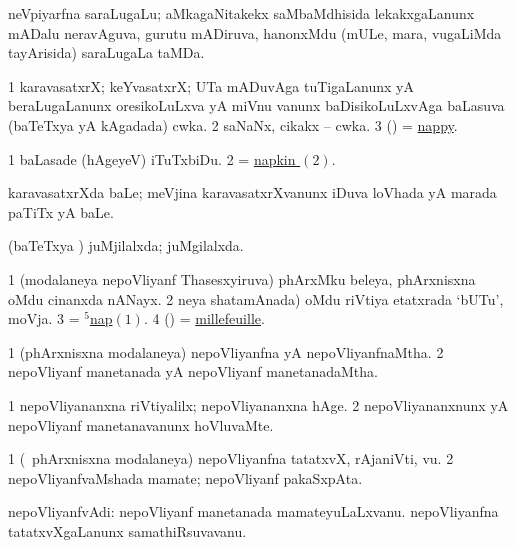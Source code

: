 \bentry
{}
\gl{\nA}
\bmng
neVpiyarfna saraLugaLu; aMkagaNitakekx saMbaMdhisida lekakxgaLanunx mADalu neravAguva, gurutu mADiruva, hanonxMdu (mULe, mara, \mo vugaLiMda tayArisida) saraLugaLa taMDa. 
\emng
\eentry

\bentry
{}
\gl{\nA}
\bmng
\bnum
\num{1} karavasatxrX; keYvasatxrX; UTa mADuvAga tuTigaLanunx yA beraLugaLanunx oresikoLuLxva yA miVnu \mo vanunx baDisikoLuLxvAga baLasuva (baTeTxya yA kAgadada) cwka. 
\hypertarget{napkin(2)}{} 
\num{2} saNaNx, cikakx -- cwka. 
\num{3} (\birx) = \hyperlink{nappy(1)}{nappy}. 
\enum
\emng

\noindent
\gl{\pagu}
\bmng
\bnum
\num{1}  baLasade (hAgeyeV) iTuTxbiDu. 
\num{2}  = \hyperlink{napkin(2)}{napkin \((2)\)}. 
\enum
\emng
\eentry

\bentry
{}
\gl{\nA}
\bmng
karavasatxrXda baLe; meVjina karavasatxrXvanunx iDuva loVhada yA marada paTiTx yA baLe. 
\emng
\eentry

\bentry
{}
\gl{\gu}
\bmng
(baTeTxya \vi) juMjilalxda; juMgilalxda. 
\emng
\eentry

\bentry
{}
\gl{\nA}
\bmng
\bnum
\num{1} (modalaneya nepoVliyanf Thasesxyiruva)  phArxMku beleya, phArxnisxna oMdu cinanxda nANayx. 
\num{2} neya shatamAnada) oMdu riVtiya etatxrada `bUTu', moVja. 
\num{3} = \hyperlink{nap(5)}{$^5$nap\((1)\)}. 
\num{4} (\ame) = \hyperref{kandict_m.pdf}{M}{millefeuille}{millefeuille}. 
\enum
\emng
\eentry

\bentry
{}
\gl{\gu}
\bmng
\bnum
\num{1} (phArxnisxna modalaneya) nepoVliyanfna yA nepoVliyanfnaMtha. 
\num{2} nepoVliyanf manetanada yA nepoVliyanf manetanadaMtha. 
\enum
\emng
\eentry

\bentry
{}
\gl{\kirxvi}
\bmng
\bnum
\num{1} nepoVliyananxna riVtiyalilx; nepoVliyananxna hAge. 
\num{2} nepoVliyananxnunx yA nepoVliyanf manetanavanunx hoVluvaMte. 
\enum
\emng
\eentry

\bentry
{}
\gl{\nA}
\bmng
\bnum
\num{1} (\kanmu\ phArxnisxna modalaneya) nepoVliyanfna tatatxvX, rAjaniVti, \mo vu. 
\num{2} nepoVliyanfvaMshada mamate; nepoVliyanf pakaSxpAta. 
\enum
\emng
\eentry

\bentry
{}
\gl{\nA}
\bmng
nepoVliyanfvAdi: 
\banum
{} nepoVliyanf manetanada mamateyuLaLxvanu. 
 nepoVliyanfna tatatxvXgaLanunx samathiRsuvavanu. 
\eanum
\emng
\eentry

